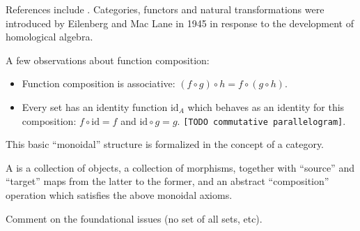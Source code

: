 References include \cite{Mac2,Rie,Lei,Borc,Lawv}. Categories, functors and natural transformations were introduced by Eilenberg and Mac Lane in 1945 in response to the development of homological algebra. %

A few observations about function composition:
\begin{itemize}
\item Function composition is associative: $(f \circ g) \circ h = f \circ (g \circ h)$.
\item Every set has an identity function $\mathrm{id}_A$ which behaves as an identity for this composition: $f \circ \mathrm{id} = f$ and $\mathrm{id} \circ g = g$. \texttt{[TODO commutative parallelogram]}.
\end{itemize}

This basic ``monoidal'' structure is formalized in the concept of a category.

\begin{definition}
A  is a collection of objects, a collection of morphisms, together with ``source'' and ``target'' maps from the latter to the former, and an abstract ``composition'' operation which satisfies the above monoidal axioms.
\end{definition}

\begin{remark}
Comment on the foundational issues (no set of all sets, etc).
\end{remark}